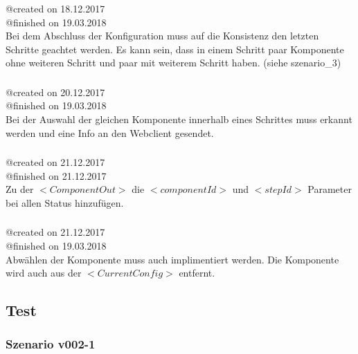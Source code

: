 \documentclass{article}
\begin{document}
\subsubsection{}
@created on 18.12.2017\\
@finished on 19.03.2018\\

Bei dem Abschluss der Konfiguration muss auf die Konsistenz den letzten
Schritte geachtet werden. Es kann sein, dass in einem Schritt paar Komponente
ohne weiteren Schritt und paar mit weiterem Schritt haben. (siehe
szenario\_3)\\

\subsubsection{}
@created on 20.12.2017\\
@finished on 19.03.2018\\

Bei der Auswahl der gleichen Komponente innerhalb eines Schrittes muss erkannt
werden und eine Info an den Webclient gesendet.\\

\subsubsection{}
@created on 21.12.2017\\
@finished on 21.12.2017\\

Zu der $<ComponentOut>$ die $<componentId>$ und $<stepId>$ Parameter bei
allen Status hinzuf\"ugen.\\

\subsubsection{}
@created on 21.12.2017\\
@finished on 19.03.2018\\

Abw\"ahlen der Komponente muss auch implimentiert werden. Die Komponente wird
auch aus der $<CurrentConfig>$ entfernt.\\

\subsection{Test}

\subsubsection{Szenario v002-1}
\end{document}
